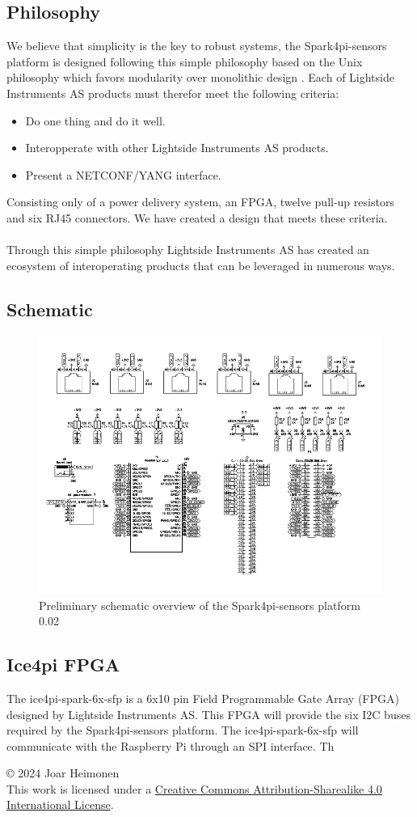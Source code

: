 \documentclass[12pt]{article}
\newcommand{\writersnote}[1]{\marginpar{\small{\textcolor{blue}{Writer's note:}} \scriptsize\textit{#1}}}
\newcommand{\license}{
    \vspace{1em}
    \noindent\small{© 2024 Joar Heimonen\\
    This work is licensed under a \href{https://creativecommons.org/licenses/by-sa/4.0/}{Creative Commons Attribution-Sharealike 4.0 International License}.}
    \vspace{1em}
}
\begin{document}
\subsection{Philosophy}
We believe that simplicity is the key to robust systems, the Spark4pi-sensors platform is designed following this simple philosophy based on the 
Unix philosophy which favors modularity over monolithic design \cite{BasicsUnixPhilosophy}.
Each of Lightside Instruments AS products must therefor meet the following criteria:
\begin{itemize}
    \item Do one thing and do it well.
    \item Interopperate with other Lightside Instruments AS products.
    \item Present a NETCONF/YANG interface.
\end{itemize}
Consisting only of a power delivery system, an FPGA, twelve pull-up resistors and six RJ45 connectors. We have 
created a design that meets these criteria.
\\
\\
Through this simple philosophy Lightside Instruments AS has created an ecosystem of interoperating products that can be
leveraged in numerous ways.

\subsection{Schematic}
\begin{figure}[H]
    \includegraphics[width=\textwidth]{schematic.png}
    \caption{Preliminary schematic overview of the Spark4pi-sensors platform 0.02}
\end{figure}


\subsection{Ice4pi FPGA}
The ice4pi-spark-6x-sfp is a 6x10 pin Field Programmable Gate Array (FPGA) designed by Lightside Instruments AS.
This FPGA will provide the six I2C buses required by the Spark4pi-sensors platform. 
The ice4pi-spark-6x-sfp will communicate with the Raspberry Pi through an SPI interface.
Th


\pagebreak
{}
\printbibliography
\license
\end{document}
